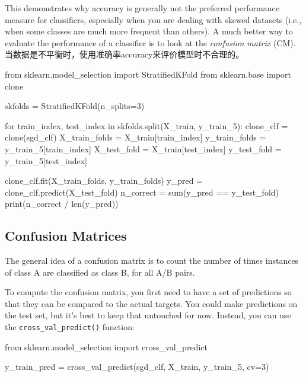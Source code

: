 This demonstrates why accuracy is generally not the preferred performance measure for classifiers, especially when you are dealing with skewed datasets (i.e., when some classes are much more frequent than others). A much better way to evaluate the performance of a classifier is to look at the \emph{confusion matrix} (CM). 当数据是不平衡时，使用准确率accuracy来评价模型时不合理的。

\begin{pyc}
from sklearn.model_selection import StratifiedKFold
from sklearn.base import clone

skfolds = StratifiedKFold(n_splits=3)

for train_index, test_index in skfolds.split(X_train, y_train_5):
    clone_clf = clone(sgd_clf)
    X_train_folds = X_train[train_index]
    y_train_folds = y_train_5[train_index]
    X_test_fold = X_train[test_index]
    y_test_fold = y_train_5[test_index]

    clone_clf.fit(X_train_folds, y_train_folds)
    y_pred = clone_clf.predict(X_test_fold)
    n_correct = sum(y_pred == y_test_fold)
    print(n_correct / len(y_pred))
\end{pyc}

\subsection{Confusion Matrices}
The general idea of a confusion matrix is to count the number of times instances of class A are classified as class B, for all A/B pairs. 

To compute the confusion matrix, you first need to have a set of predictions so that they can be compared to the actual targets. You could make predictions on the test set, but it's best to keep that untouched for now. Instead, you can use the \verb|cross_val_predict()| function:
\begin{pyc}
from sklearn.model_selection import cross_val_predict

y_train_pred = cross_val_predict(sgd_clf, X_train, y_train_5, cv=3)
\end{pyc}

